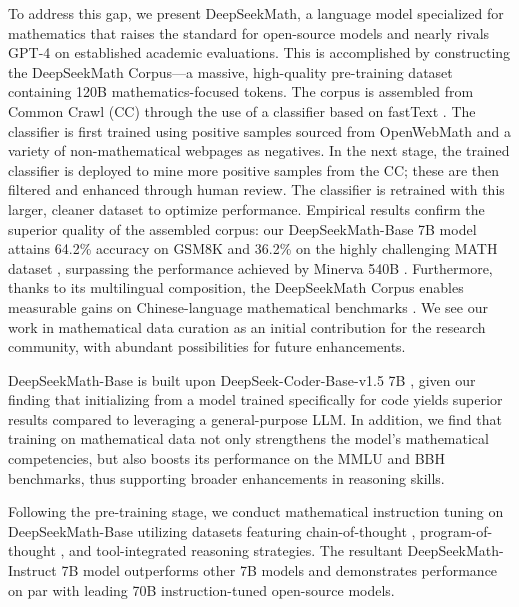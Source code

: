 To address this gap, we present DeepSeekMath, a language model specialized for mathematics that raises the standard for open-source models and nearly rivals GPT-4 on established academic evaluations. This is accomplished by constructing the DeepSeekMath Corpus—a massive, high-quality pre-training dataset containing 120B mathematics-focused tokens. The corpus is assembled from Common Crawl (CC) through the use of a classifier based on fastText \citep{joulin2016fasttext}. The classifier is first trained using positive samples sourced from OpenWebMath \citep{openwebmath} and a variety of non-mathematical webpages as negatives. In the next stage, the trained classifier is deployed to mine more positive samples from the CC; these are then filtered and enhanced through human review. The classifier is retrained with this larger, cleaner dataset to optimize performance. Empirical results confirm the superior quality of the assembled corpus: our DeepSeekMath-Base 7B model attains 64.2\% accuracy on GSM8K \citep{gsm8k} and 36.2\% on the highly challenging MATH dataset \citep{MATH}, surpassing the performance achieved by Minerva 540B \citep{minerva}. Furthermore, thanks to its multilingual composition, the DeepSeekMath Corpus enables measurable gains on Chinese-language mathematical benchmarks \citep{wei2023cmath,agieval}. We see our work in mathematical data curation as an initial contribution for the research community, with abundant possibilities for future enhancements.

DeepSeekMath-Base is built upon DeepSeek-Coder-Base-v1.5 7B \citep{deepseek-coder}, given our finding that initializing from a model trained specifically for code yields superior results compared to leveraging a general-purpose LLM. In addition, we find that training on mathematical data not only strengthens the model's mathematical competencies, but also boosts its performance on the MMLU \citep{mmlu} and BBH \citep{bbh} benchmarks, thus supporting broader enhancements in reasoning skills.

Following the pre-training stage, we conduct mathematical instruction tuning on DeepSeekMath-Base utilizing datasets featuring chain-of-thought \citep{cot}, program-of-thought \citep{pot,pal}, and tool-integrated reasoning \citep{tora} strategies. The resultant DeepSeekMath-Instruct 7B model outperforms other 7B models and demonstrates performance on par with leading 70B instruction-tuned open-source models.

